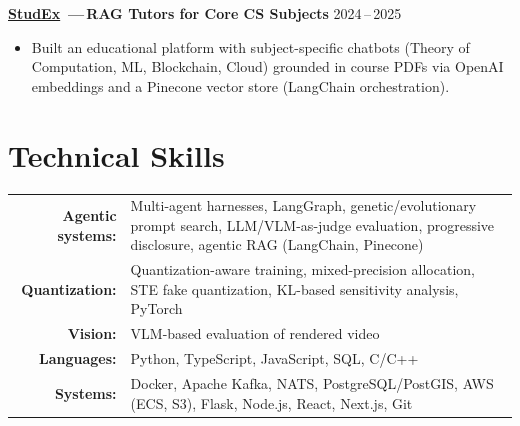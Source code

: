 \documentclass[11pt,a4paper]{article}
\begin{document}
\vspace{0.35em}

\textbf{\href{https://github.com/jayraj-kl/stud-ex}{StudEx}%
\,---\,RAG Tutors for Core CS Subjects}
\hfill 2024\,--\,2025
\begin{itemize}
  \item Built an educational platform with subject-specific chatbots (Theory of Computation, ML, Blockchain, Cloud) grounded in course PDFs via OpenAI embeddings and a Pinecone vector store (LangChain orchestration).
\end{itemize}


\section{Technical Skills}

\begin{tabularx}{\textwidth}{@{}>{\bfseries\small}r@{\hspace{1.2em}}X@{}}
  Agentic systems: & Multi-agent harnesses, LangGraph, genetic/evolutionary prompt
                     search, LLM/VLM-as-judge evaluation, progressive disclosure,
                     agentic RAG (LangChain, Pinecone) \\[0.3em]
  Quantization:    & Quantization-aware training, mixed-precision allocation,
                     STE fake quantization, KL-based sensitivity analysis, PyTorch \\[0.3em]
  Vision:          & VLM-based evaluation of rendered video \\[0.3em]
  Languages:       & Python, TypeScript, JavaScript, SQL, C/C++ \\[0.3em]
  Systems:         & Docker, Apache Kafka, NATS, PostgreSQL/PostGIS, AWS (ECS, S3),
                     Flask, Node.js, React, Next.js, Git \\
\end{tabularx}
\end{document}
